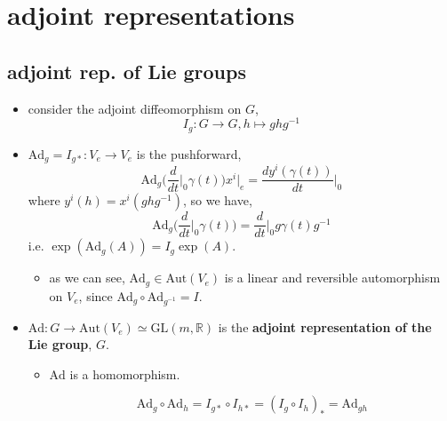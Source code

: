 \section{adjoint representations}
\subsection{adjoint rep. of Lie groups}
\begin{itemize}
	\item consider the adjoint diffeomorphism on $G$,
	\begin{equation}
		I_g : G \rightarrow G, h \mapsto g h g^{- 1}
	\end{equation}
	
	\item $\mathrm{Ad}_g = I_{g *} : V_e \rightarrow V_e$ is the pushforward,
	\begin{equation}
		\mathrm{Ad}_g \Big( \frac{d}{dt} \Big|_0 \gamma(t) \Big) x^i \Big|_e = \frac{d y^i(\gamma(t))}{dt} \Big|_0
	\end{equation}
	where $y^i(h) = x^i(g h g^{- 1})$, so we have,
	\begin{equation}
		\mathrm{Ad}_g \Big( \frac{d}{dt} \Big|_0 \gamma(t) \Big) = \frac{d}{dt} \Big|_0 g \gamma(t) g^{- 1}
	\end{equation}
	i.e. $\exp(\mathrm{Ad}_g(A)) = I_g \exp(A)$.
	\begin{itemize}
		\item as we can see, $\mathrm{Ad}_g \in \mathrm{Aut}(V_e)$ is a linear and reversible automorphism on $V_e$, since $\mathrm{Ad}_g \circ \mathrm{Ad}_{g^{- 1}} = I$.
	\end{itemize}
	
	\item $\mathrm{Ad} : G \rightarrow \mathrm{Aut}(V_e) \simeq \mathrm{GL}(m, \mathbb{R})$ is the \textbf{adjoint representation of the Lie group}, $G$.
	\begin{itemize}
		\item $\mathrm{Ad}$ is a homomorphism.
		
		\begin{tcolorbox}[title=proof:]
			\begin{equation}
				\mathrm{Ad}_g \circ \mathrm{Ad}_h = I_{g *} \circ I_{h *} = (I_g \circ I_h)_* = \mathrm{Ad}_{g h}
			\end{equation}
		\end{tcolorbox}
	\end{itemize}
\end{itemize}

